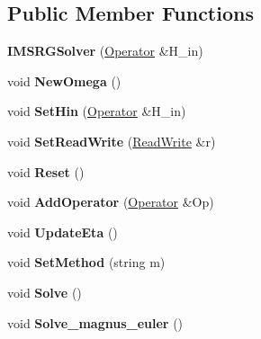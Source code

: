 \subsection*{Public Member Functions}
\begin{DoxyCompactItemize}
\item 
\mbox{\label{classIMSRGSolver_a675162bee60773d452ffb076a18c0bd2}} 
{\bfseries I\+M\+S\+R\+G\+Solver} (\hyperlink{classOperator}{Operator} \&H\+\_\+in)
\item 
\mbox{\label{classIMSRGSolver_ada1bbf144e7fda4ce0e40ae1a9bfefc4}} 
void {\bfseries New\+Omega} ()
\item 
\mbox{\label{classIMSRGSolver_aa36481167598d318c0217bcb3d671098}} 
void {\bfseries Set\+Hin} (\hyperlink{classOperator}{Operator} \&H\+\_\+in)
\item 
\mbox{\label{classIMSRGSolver_af0f247c918c2236b021e3cf5917dba9b}} 
void {\bfseries Set\+Read\+Write} (\hyperlink{classReadWrite}{Read\+Write} \&r)
\item 
\mbox{\label{classIMSRGSolver_ae8fae5b0c5c3c7c19616491fa353854a}} 
void {\bfseries Reset} ()
\item 
\mbox{\label{classIMSRGSolver_a4f5b4c91debb484998661a7798eb438d}} 
void {\bfseries Add\+Operator} (\hyperlink{classOperator}{Operator} \&Op)
\item 
\mbox{\label{classIMSRGSolver_ae8ca93f3b9c3a4cc152b2f2e07a03dd5}} 
void {\bfseries Update\+Eta} ()
\item 
\mbox{\label{classIMSRGSolver_a2eb9b114da9b3b04e01f57ebaa2754a7}} 
void {\bfseries Set\+Method} (string m)
\item 
\mbox{\label{classIMSRGSolver_a7d91b6c025bb284ca1093790e701a170}} 
void {\bfseries Solve} ()
\item 
\mbox{\label{classIMSRGSolver_a07a987e5fbcbd108e5865df27d709a17}} 
void {\bfseries Solve\+\_\+magnus\+\_\+euler} ()
\item 

\end{DoxyCompactItemize}
